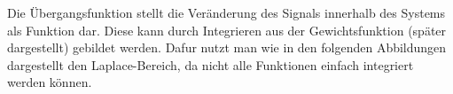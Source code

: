 Die Übergangsfunktion stellt die Veränderung des Signals innerhalb des Systems als Funktion dar. Diese
kann durch Integrieren aus der Gewichtsfunktion (später dargestellt) gebildet werden. Dafur nutzt man wie
in den folgenden Abbildungen dargestellt den Laplace-Bereich, da nicht alle Funktionen einfach integriert
werden können.
\vspace*{0.5cm}
\begin{figure}[h]
    \begin{center}
    \end{center}
\end{figure}
\vspace*{0.5cm}
